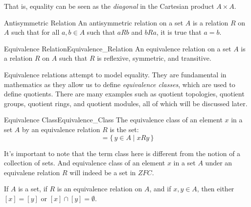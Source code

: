     That is, equality can be seen as the \textit{diagonal} in the
    Cartesian product $A\times{A}$.
    \begin{fdefinition}{Antisymmetric Relation}
        An antisymmetric relation on a set $A$ is a relation $R$ on $A$
        such that for all $a,b\in{A}$ such that $aRb$ and $bRa$, it
        is true that $a=b$.
    \end{fdefinition}
    \begin{fdefinition}{Equivalence Relation}{Equivalence_Relation}
        An equivalence relation on a set $A$ is a relation $R$ on $A$ such that
        $R$ is reflexive, symmetric, and transitive.
    \end{fdefinition}
    Equivalence relations attempt to model equality. They are fundamental in
    mathematics as they allow us to define \textit{equivalence classes}, which
    are used to define quotients. There are many examples such as quotient
    topologies, quotient groups, quotient rings, and quotient modules, all of
    which will be discussed later.
    \begin{fdefinition}{Equivalence Class}{Equivalence_Class}
        The equivalence class of an element $x$ in a set $A$ by an
        equivalence relation $R$ is the set:
        \begin{equation*}
            [x]=\{\,y\in{A}\;|\;xRy\,\}
        \end{equation*}
    \end{fdefinition}
    It's important to note that the term class here is different from the notion
    of a collection of sets. And equivalence class of an element $x$ in a set
    $A$ under an equivalene relation $R$ will indeed be a set in $ZFC$.
    \begin{theorem}
        \label{thm:Equivalence_Classes_Disjoint_or_Equal}%
        If $A$ is a set, if $R$ is an equivalence relation on $A$, and if
        $x,y\in{A}$, then either $[x]=[y]$ or $[x]\cap[y]=\emptyset$.
    \end{theorem}
